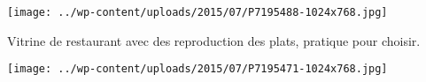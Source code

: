  

\begin{center} \texttt{[image: ../wp-content/uploads/2015/07/P7195488-1024x768.jpg]} \end{center}

 

 Vitrine de restaurant avec des reproduction des plats, pratique pour choisir. 

 

\begin{center} \texttt{[image: ../wp-content/uploads/2015/07/P7195471-1024x768.jpg]} \end{center}




 
 
